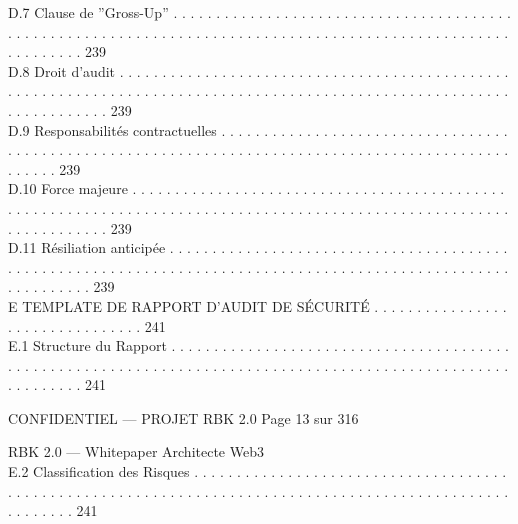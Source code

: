 \documentclass[12pt,landscape,a4paper]{article}
\newenvironment{confidential}
{\begin{tcolorbox}[
    colback=rbkred!5!white,
    colframe=rbkred!75!black,
    title=CONFIDENTIEL,
    fonttitle=\bfseries\color{white},
    coltitle=rbkred!75!black,
    breakable,
    enhanced,
    frame hidden,
    borderline west={2pt}{0pt}{rbkred!75!black}
]}
{\end{tcolorbox}}
\begin{document}
D.7     Clause de ”Gross-Up” . . . . . . . . . . . . . . . . . . . . . . . . . . . . . . . . . . . . . . . . . . . . . . . . . . . . . . . . . . . . . . . . . . . . . . . . . . . . . . . . . . . . . . . . . . . . . . . . . . . . . . . . . . . . 239\\
D.8     Droit d’audit . . . . . . . . . . . . . . . . . . . . . . . . . . . . . . . . . . . . . . . . . . . . . . . . . . . . . . . . . . . . . . . . . . . . . . . . . . . . . . . . . . . . . . . . . . . . . . . . . . . . . . . . . . . . . . . . . . . . . 239\\
D.9     Responsabilités contractuelles . . . . . . . . . . . . . . . . . . . . . . . . . . . . . . . . . . . . . . . . . . . . . . . . . . . . . . . . . . . . . . . . . . . . . . . . . . . . . . . . . . . . . . . . . . . . . . . . . . . 239\\
D.10    Force majeure . . . . . . . . . . . . . . . . . . . . . . . . . . . . . . . . . . . . . . . . . . . . . . . . . . . . . . . . . . . . . . . . . . . . . . . . . . . . . . . . . . . . . . . . . . . . . . . . . . . . . . . . . . . . . . . . . . . 239\\
D.11    Résiliation anticipée . . . . . . . . . . . . . . . . . . . . . . . . . . . . . . . . . . . . . . . . . . . . . . . . . . . . . . . . . . . . . . . . . . . . . . . . . . . . . . . . . . . . . . . . . . . . . . . . . . . . . . . . . . . . . 239\\
\vspace{0.5em}
E     TEMPLATE DE RAPPORT D’AUDIT DE SÉCURITÉ . . . . . . . . . . . . . . . . . . . . . . . . . . . . . . . . 241\\
E.1     Structure du Rapport . . . . . . . . . . . . . . . . . . . . . . . . . . . . . . . . . . . . . . . . . . . . . . . . . . . . . . . . . . . . . . . . . . . . . . . . . . . . . . . . . . . . . . . . . . . . . . . . . . . . . . . . . . . . 241\\
\vspace{0.5em}
\vspace{0.5em}
\vspace{0.5em}
\begin{confidential}CONFIDENTIEL — PROJET RBK 2.0                                                                                Page 13 sur 316\end{confidential}
RBK 2.0 — Whitepaper Architecte Web3\\
\vspace{0.5em}
\vspace{0.5em}
E.2     Classification des Risques . . . . . . . . . . . . . . . . . . . . . . . . . . . . . . . . . . . . . . . . . . . . . . . . . . . . . . . . . . . . . . . . . . . . . . . . . . . . . . . . . . . . . . . . . . . . . . . . . . . . . . . . 241\\
\end{document}
